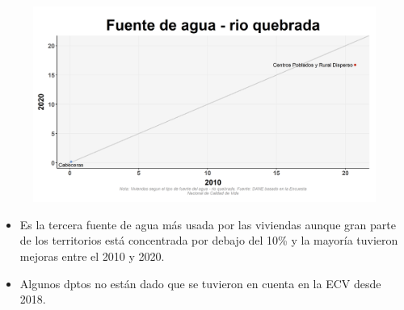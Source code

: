     \begin{figure}[H]
        \caption[Río o quebradas como fuentes de agua por departamentos - 2010 VS 2020 ]{\label{rio_dptos_vs} }
        \begin{center}
        \includegraphics[width=\textwidth,keepaspectratio]{img/var_142_scatter_time.png}
        \end{center}
    \end{figure}
            \begin{itemize}
                    \item Es la tercera fuente de agua más usada por las viviendas aunque gran parte de los territorios está concentrada por debajo del 10\% y la mayoría tuvieron mejoras entre el 2010 y 2020.
                    \item Algunos dptos no están dado que se tuvieron en cuenta en la ECV desde 2018.
                    \end{itemize}

